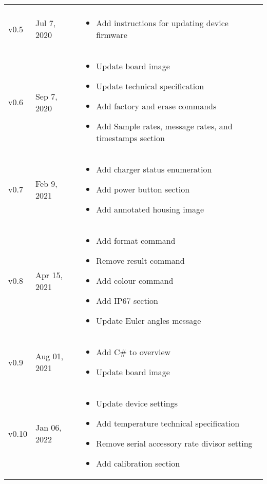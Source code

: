 \begin{longtable}{| >{\centering}p{} | p{} | >{\raggedright\arraybackslash}p{} |}
\begin{itemize}
        \end{itemize}\\
        v0.5 & Jul 7, 2020 &
        \begin{itemize}
			\item Add instructions for updating device firmware
        \end{itemize}\\
        v0.6 & Sep 7, 2020 &
        \begin{itemize}
			\item Update board image
			\item Update technical specification
			\item Add factory and erase commands
			\item Add Sample rates, message rates, and timestamps section
        \end{itemize}\\
        v0.7 & Feb 9, 2021 &
        \begin{itemize}
			\item Add charger status enumeration
			\item Add power button section
			\item Add annotated housing image
        \end{itemize}\\
        v0.8 & Apr 15, 2021 &
        \begin{itemize}
			\item Add format command
			\item Remove result command
			\item Add colour command
			\item Add \ac{IP67} section
			\item Update Euler angles message
        \end{itemize}\\
        v0.9 & Aug 01, 2021 &
        \begin{itemize}
			\item Add C\# to overview
			\item Update board image
        \end{itemize}\\
        v0.10 & Jan 06, 2022 &
        \begin{itemize}
			\item Update device settings
			\item Add temperature technical specification
			\item Remove serial accessory rate divisor setting
			\item Add calibration section

\end{itemize}
\end{longtable}
